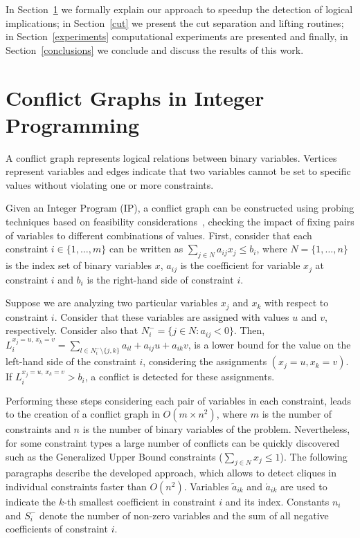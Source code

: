 \documentclass{endm}
\begin{document}
In Section~\ref{seccgraph} we formally explain our approach to speedup the detection of logical implications; in Section~\ref{cut} we present the cut separation and lifting routines; in Section~\ref{experiments} computational experiments are presented and finally, in Section~\ref{conclusions} we conclude and discuss the results of this work.

\section{Conflict Graphs in Integer Programming}\label{seccgraph}

A conflict graph represents logical relations between binary variables. Vertices represent variables and edges indicate that two variables cannot be set to specific values without violating one or more constraints.

Given an Integer Program (IP), a conflict graph can be constructed using probing techniques based on feasibility considerations~\cite{achterberg,atamturk}, checking the impact of fixing pairs of variables to different combinations of values. First, consider that each constraint $i \in \{1,\ldots,m\}$ can be written as $\displaystyle \sum_{j \in N} a_{ij}x_{j} \leq b_{i}$, where $N=\{1,\ldots,n\}$ is the index set of binary variables $x$, $a_{ij}$ is the coefficient for variable $x_{j}$ at constraint $i$ and $b_{i}$ is the right-hand side of constraint $i$.

Suppose we are analyzing two particular variables $x_j$ and $x_k$ with respect to constraint $i$. Consider that these variables are assigned with values $u$ and $v$, respectively. Consider also that $N_{i}^{-} = \{j \in N : a_{ij} < 0\}$. Then, $\displaystyle
L_{i}^{x_j = u,\, x_k = v}=\sum_{l\in N_{i}^{-} \setminus \{j, k\}}a_{il}+a_{ij}u+a_{ik}v $, is a lower bound for the value on the left-hand side of the constraint $i$, considering the assignments $(x_j =u,x_k=v)$. If $L_{i}^{x_j = u,\, x_k = v} > b_{i}$, a conflict is detected for these assignments. 

Performing these steps considering each pair of variables in each constraint, leads to the creation of a conflict graph in $O(m \times n^2)$, where $m$ is the number of constraints and $n$ is the number of binary variables of the problem. Nevertheless, for some constraint types a large number of conflicts can be quickly discovered such as the Generalized Upper Bound constraints ($\sum_{j\in N}x_j \leq 1$). The following paragraphs describe the developed approach, which allows to detect cliques in individual constraints faster than $O(n^2)$. Variables $\tilde{a}_{ik}$ and $\acute{a}_{ik}$ are used to indicate the $k$-th smallest coefficient in constraint $i$ and its index. Constants $n_i$ and $S_i^-$ denote the number of non-zero variables and the sum of all negative coefficients of constraint $i$.
\end{document}

